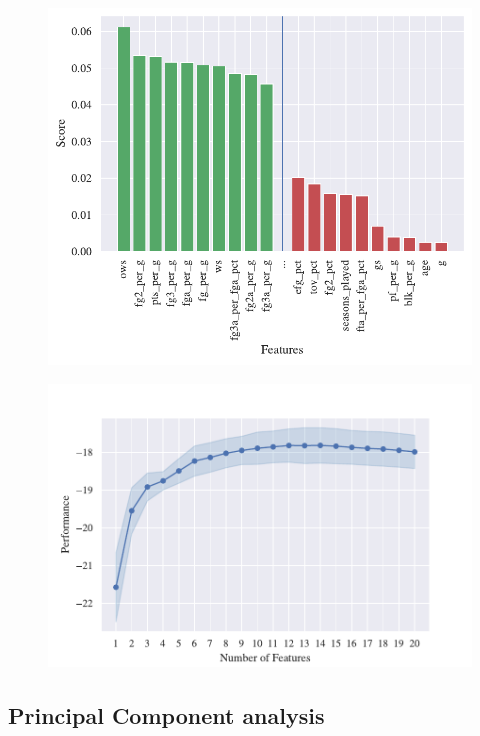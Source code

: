\begin{figure}[H]
\centering
\begin{minipage}{.5\textwidth}
  \centering
  \includegraphics[width=1.0\linewidth]{figures/relieff.pdf}
  \label{fig:relief}
\end{minipage}%
\begin{minipage}{.5\textwidth}
  \centering
  \includegraphics[width=1.0\linewidth]{figures/sfs.pdf}
  \label{fig:sfs}
\end{minipage}
\end{figure}

\subsection{Principal Component analysis}%
\label{sub:pca}

